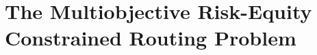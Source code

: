 \documentclass[preprint,12pt]{elsarticle}
\begin{document}







\section{The Multiobjective Risk-Equity Constrained Routing Problem} \label{S_RECRP}
\end{document}
